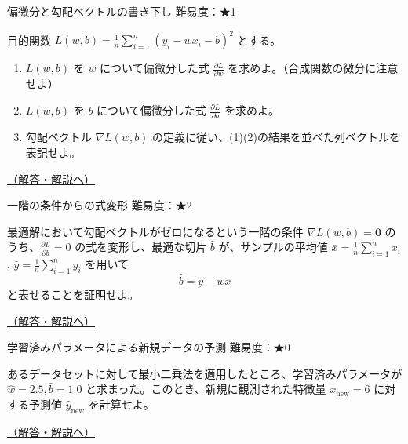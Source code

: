 \begin{questionbox}[label=q:2-2-1]{偏微分と勾配ベクトルの書き下し \hfill \normalfont \small 難易度：★1}

目的関数 \(L(w,b) = \frac{1}{n} \sum_{i=1}^n (y_i - wx_i - b)^2\)
とする。

\begin{enumerate}
\def\labelenumi{\arabic{enumi}.}
\tightlist
\item
  \(L(w,b)\) を \(w\) について偏微分した式
  \(\frac{\partial L}{\partial w}\)
  を求めよ。（合成関数の微分に注意せよ）
\item
  \(L(w,b)\) を \(b\) について偏微分した式
  \(\frac{\partial L}{\partial b}\) を求めよ。
\item
  勾配ベクトル \(\nabla L(w,b)\)
  の定義に従い、(1)(2)の結果を並べた列ベクトルを表記せよ。
\end{enumerate}

\hfill 

\hyperref[a:2-2-1]{（解答・解説へ）}

\end{questionbox}

\begin{questionbox}[label=q:2-2-2]{一階の条件からの式変形 \hfill \normalfont \small 難易度：★2}

最適解において勾配ベクトルがゼロになるという一階の条件
\(\nabla L(w,b) = \mathbf{0}\)
のうち、\(\frac{\partial L}{\partial b} = 0\) の式を変形し、最適な切片
\(\hat{b}\) が、サンプルの平均値
\(\bar{x} = \frac{1}{n}\sum_{i=1}^n x_i\),
\(\bar{y} = \frac{1}{n}\sum_{i=1}^n y_i\) を用いて \[
\hat{b} = \bar{y} - w\bar{x}
\] と表せることを証明せよ。

\hfill 

\hyperref[a:2-2-2]{（解答・解説へ）}

\end{questionbox}

\begin{questionbox}[label=q:2-2-3]{学習済みパラメータによる新規データの予測 \hfill \normalfont \small 難易度：★0}

あるデータセットに対して最小二乗法を適用したところ、学習済みパラメータが
\(\hat{w} = 2.5, \hat{b} = 1.0\)
と求まった。このとき、新規に観測された特徴量 \(x_{\text{new}} = 6\)
に対する予測値 \(\hat{y}_{\text{new}}\) を計算せよ。

\hfill 

\hyperref[a:2-2-3]{（解答・解説へ）}

\end{questionbox}

